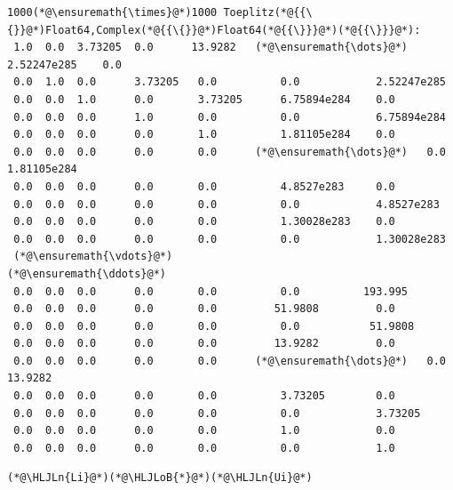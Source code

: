 \documentclass[12pt,a4paper]{article}
\newcommand{\HLJLn}[1]{#1}
\newcommand{\HLJLoB}[1]{\textcolor[RGB]{102,102,102}{\textbf{#1}}}
\begin{document}
\begin{lstlisting}
1000(*@\ensuremath{\times}@*)1000 Toeplitz(*@{{\{}}@*)Float64,Complex(*@{{\{}}@*)Float64(*@{{\}}}@*)(*@{{\}}}@*):
 1.0  0.0  3.73205  0.0      13.9282   (*@\ensuremath{\dots}@*)   2.52247e285    0.0
 0.0  1.0  0.0      3.73205   0.0          0.0            2.52247e285
 0.0  0.0  1.0      0.0       3.73205      6.75894e284    0.0
 0.0  0.0  0.0      1.0       0.0          0.0            6.75894e284
 0.0  0.0  0.0      0.0       1.0          1.81105e284    0.0
 0.0  0.0  0.0      0.0       0.0      (*@\ensuremath{\dots}@*)   0.0            1.81105e284
 0.0  0.0  0.0      0.0       0.0          4.8527e283     0.0
 0.0  0.0  0.0      0.0       0.0          0.0            4.8527e283
 0.0  0.0  0.0      0.0       0.0          1.30028e283    0.0
 0.0  0.0  0.0      0.0       0.0          0.0            1.30028e283
 (*@\ensuremath{\vdots}@*)                                     (*@\ensuremath{\ddots}@*)                
 0.0  0.0  0.0      0.0       0.0          0.0          193.995
 0.0  0.0  0.0      0.0       0.0         51.9808         0.0
 0.0  0.0  0.0      0.0       0.0          0.0           51.9808
 0.0  0.0  0.0      0.0       0.0         13.9282         0.0
 0.0  0.0  0.0      0.0       0.0      (*@\ensuremath{\dots}@*)   0.0           13.9282
 0.0  0.0  0.0      0.0       0.0          3.73205        0.0
 0.0  0.0  0.0      0.0       0.0          0.0            3.73205
 0.0  0.0  0.0      0.0       0.0          1.0            0.0
 0.0  0.0  0.0      0.0       0.0          0.0            1.0
\end{lstlisting}


\begin{lstlisting}
(*@\HLJLn{Li}@*)(*@\HLJLoB{*}@*)(*@\HLJLn{Ui}@*)
\end{lstlisting}
\end{document}
